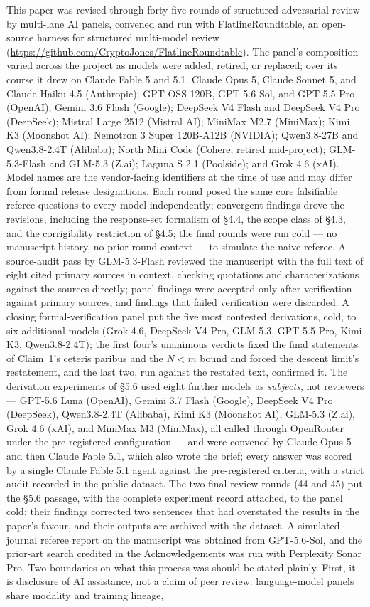 \documentclass[11pt]{article}
\theoremstyle{definition}
\begin{document}
This paper was revised through forty-five rounds of structured adversarial review by multi-lane AI panels, convened and run with FlatlineRoundtable, an open-source harness for structured multi-model review (\url{https://github.com/CryptoJones/FlatlineRoundtable}). The panel's composition varied across the project as models were added, retired, or replaced; over its course it drew on Claude Fable 5 and 5.1, Claude Opus 5, Claude Sonnet 5, and Claude Haiku 4.5 (Anthropic); GPT-OSS-120B, GPT-5.6-Sol, and GPT-5.5-Pro (OpenAI); Gemini 3.6 Flash (Google); DeepSeek V4 Flash and DeepSeek V4 Pro (DeepSeek); Mistral Large 2512 (Mistral AI); MiniMax M2.7 (MiniMax); Kimi K3 (Moonshot AI); Nemotron 3 Super 120B-A12B (NVIDIA); Qwen3.8-27B and Qwen3.8-2.4T (Alibaba); North Mini Code (Cohere; retired mid-project); GLM-5.3-Flash and GLM-5.3 (Z.ai); Laguna S 2.1 (Poolside); and Grok 4.6 (xAI). Model names are the vendor-facing identifiers at the time of use and may differ from formal release designations. Each round posed the same core falsifiable referee questions to every model independently; convergent findings drove the revisions, including the response-set formalism of \S4.4, the scope class of \S4.3, and the corrigibility restriction of \S4.5; the final rounds were run cold --- no manuscript history, no prior-round context --- to simulate the naive referee. A source-audit pass by GLM-5.3-Flash reviewed the manuscript with the full text of eight cited primary sources in context, checking quotations and characterizations against the sources directly; panel findings were accepted only after verification against primary sources, and findings that failed verification were discarded. A closing formal-verification panel put the five most contested derivations, cold, to six additional models (Grok 4.6, DeepSeek V4 Pro, GLM-5.3, GPT-5.5-Pro, Kimi K3, Qwen3.8-2.4T); the first four's unanimous verdicts fixed the final statements of Claim~1's ceteris paribus and the $N < m$ bound and forced the descent limit's restatement, and the last two, run against the restated text, confirmed it. The derivation experiments of \S5.6 used eight further models as \emph{subjects}, not reviewers --- GPT-5.6 Luna (OpenAI), Gemini 3.7 Flash (Google), DeepSeek V4 Pro (DeepSeek), Qwen3.8-2.4T (Alibaba), Kimi K3 (Moonshot AI), GLM-5.3 (Z.ai), Grok 4.6 (xAI), and MiniMax M3 (MiniMax), all called through OpenRouter under the pre-registered configuration --- and were convened by Claude Opus 5 and then Claude Fable 5.1, which also wrote the brief; every answer was scored by a single Claude Fable 5.1 agent against the pre-registered criteria, with a strict audit recorded in the public dataset. The two final review rounds (44 and 45) put the \S5.6 passage, with the complete experiment record attached, to the panel cold; their findings corrected two sentences that had overstated the results in the paper's favour, and their outputs are archived with the dataset. A simulated journal referee report on the manuscript was obtained from GPT-5.6-Sol, and the prior-art search credited in the Acknowledgements was run with Perplexity Sonar Pro. Two boundaries on what this process was should be stated plainly. First, it is disclosure of AI assistance, not a claim of peer review: language-model panels share modality and training lineage, 
\end{document}
